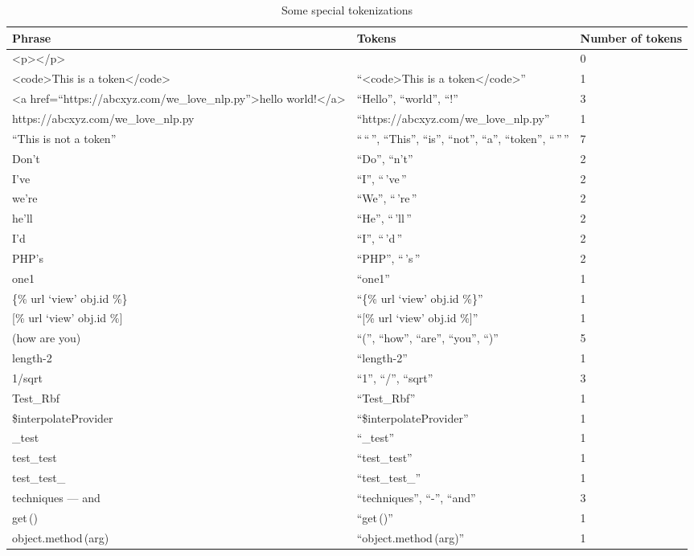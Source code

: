 \onecolumn
\begin{table}
\caption{Some special tokenizations}\label{tok}
\begin{tabu}{X[5,l]X[5,l]X[2,l]}
    \textbf{Phrase} & \textbf{Tokens} &
    \textbf{Number of tokens} \\
    \midrule
    <p></p> && 0 \\
    <code>This is a token</code> &
    ``<code>This is a token</code>'' & 1 \\
    <a href=``https://abcxyz.com/we\_love\_nlp.py''>hello world!</a> &
    ``Hello'', ``world'', ``!'' & 3 \\
    https://abcxyz.com/we\_love\_nlp.py &
    ``https://abcxyz.com/we\_love\_nlp.py'' & 1 \\
    ``This is not a token'' &
    ``\,``\,'', ``This'', ``is'', ``not'', ``a'', ``token'', ``\,''\,'' & 7 \\
    Don't & ``Do'', ``n't'' & 2 \\
    I've & ``I'', ``\,'ve\,'' & 2 \\
    we're & ``We'', ``\,'re\,'' & 2 \\
    he'll & ``He'', ``\,'ll\,'' & 2 \\
    I'd & ``I'', ``\,'d\,'' & 2 \\
    PHP's & ``PHP'', ``\,'s\,'' & 2 \\
    one1 & ``one1'' & 1 \\
    \{\% url `view' obj.id \%\} &
    ``\{\% url `view' obj.id \%\}'' & 1 \\
    {[}\% url `view' obj.id \%{]} &
    ``[\% url `view' obj.id \%]'' & 1 \\
    (how are you) &
    ``('', ``how'', ``are'', ``you'', ``)'' & 5 \\
    length-2 & ``length-2'' & 1 \\
    1/sqrt & ``1'', ``/'', ``sqrt'' & 3 \\
    Test\_Rbf & ``Test\_Rbf'' & 1 \\
    \$interpolateProvider & ``\$interpolateProvider'' & 1 \\
    \_test & ``\_test'' & 1 \\
    test\_test & ``test\_test'' & 1 \\
    test\_test\_ & ``test\_test\_'' & 1 \\
    techniques --- and & ``techniques'', ``-'', ``and'' & 3 \\
    get\,() & ``get\,()'' & 1 \\
    object.method\,(arg) & ``object.method\,(arg)'' & 1 \\

\end{tabu}
\end{table}
